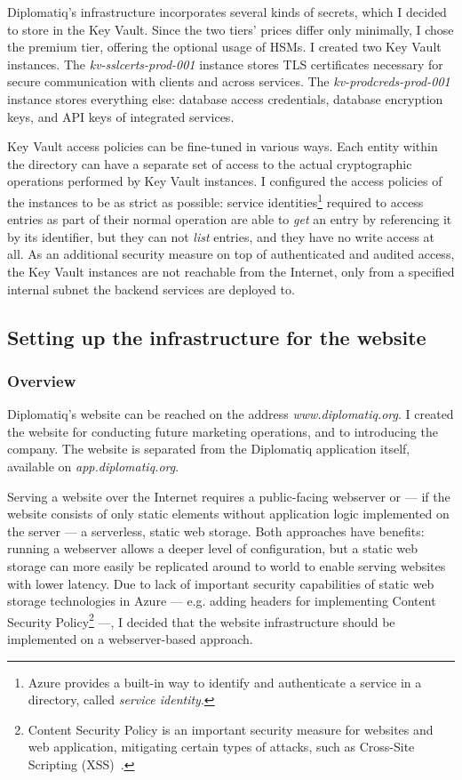 Diplomatiq's infrastructure incorporates several kinds of secrets, which I decided to store in the Key Vault. Since the two tiers' prices differ only minimally, I chose the premium tier, offering the optional usage of HSMs. I created two Key Vault instances. The \emph{kv-sslcerts-prod-001} instance stores TLS certificates necessary for secure communication with clients and across services. The \emph{kv-prodcreds-prod-001} instance stores everything else: database access credentials, database encryption keys, and API keys of integrated services.

Key Vault access policies can be fine-tuned in various ways. Each entity within the directory can have a separate set of access to the actual cryptographic operations performed by Key Vault instances. I configured the access policies of the instances to be as strict as possible: service identities\footnote{Azure provides a built-in way to identify and authenticate a service in a directory, called \emph{service identity}.} required to access entries as part of their normal operation are able to \emph{get} an entry by referencing it by its identifier, but they can not \emph{list} entries, and they have no write access at all. As an additional security measure on top of authenticated and audited access, the Key Vault instances are not reachable from the Internet, only from a specified internal subnet the backend services are deployed to.

\subsection{Setting up the infrastructure for the website}

\subsubsection{Overview}

Diplomatiq's website can be reached on the address \emph{www.diplomatiq.org}. I created the website for conducting future marketing operations, and to introducing the company. The website is separated from the Diplomatiq application itself, available on \emph{app.diplomatiq.org}.

Serving a website over the Internet requires a public-facing webserver or — if the website consists of only static elements without application logic implemented on the server — a serverless, static web storage. Both approaches have benefits: running a webserver allows a deeper level of configuration, but a static web storage can more easily be replicated around to world to enable serving websites with lower latency. Due to lack of important security capabilities of static web storage technologies in Azure — e.g. adding headers for implementing Content Security Policy\footnote{Content Security Policy is an important security measure for websites and web application, mitigating certain types of attacks, such as Cross-Site Scripting (XSS)~\cite{csp-mdn}.} —, I decided that the website infrastructure should be implemented on a webserver-based approach.

